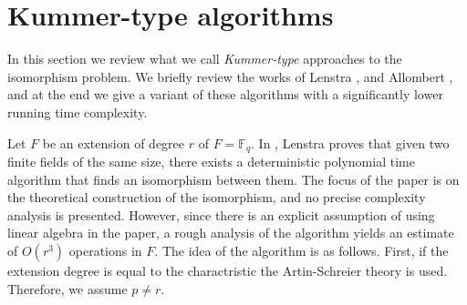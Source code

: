 \documentclass[12pt]{article}
\theoremstyle{plain}
\theoremstyle{definition}
\def\F{\ensuremath{\mathbb{F}}}
\newcounter{algorithm}
\begin{document}
\section{Kummer-type algorithms}

In this section we review what we call \textit{Kummer-type} approaches to the isomorphism problem. 
We briefly review the works of Lenstra \cite{LenstraJr91}, and Allombert \cite{Allombert02}, and at 
the end we give a variant of these algorithms with a significantly lower running time complexity.

Let $F$ be an extension of degree $r$ of $F = \F_q$. In \cite{LenstraJr91}, Lenstra proves that 
given two finite fields of the same size, there exists a deterministic polynomial time algorithm 
that finds an isomorphism between them. The focus of the paper is on the theoretical construction 
of the isomorphism, and no precise complexity analysis is presented. However, since there is an 
explicit assumption of using linear algebra in the paper, a rough analysis of the algorithm yields 
an estimate of $O(r^3)$ operations in $F$. The idea of the algorithm is as follows. First, if 
the extension degree is equal to the charactristic the Artin-Schreier theory is used. Therefore, we 
assume $p \ne r$.
\end{document}
